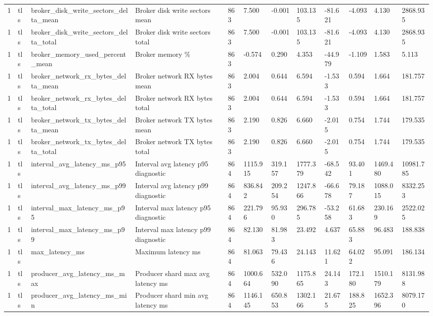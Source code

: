 \begin{longtable}{llllllllllll}
1 & tls & broker\_disk\_write\_sectors\_delta\_mean & Broker disk write sectors mean & 863 & 7.500 & -0.001 & 103.135 & -81.621 & -4.093 & 4.130 & 2868.935 \\
1 & tls & broker\_disk\_write\_sectors\_delta\_total & Broker disk write sectors total & 863 & 7.500 & -0.001 & 103.135 & -81.621 & -4.093 & 4.130 & 2868.935 \\
1 & tls & broker\_memory\_used\_percent\_mean & Broker memory \% & 863 & -0.574 & 0.290 & 4.353 & -44.979 & -1.109 & 1.583 & 5.113 \\
1 & tls & broker\_network\_rx\_bytes\_delta\_mean & Broker network RX bytes mean & 863 & 2.004 & 0.644 & 6.594 & -1.533 & 0.594 & 1.664 & 181.757 \\
1 & tls & broker\_network\_rx\_bytes\_delta\_total & Broker network RX bytes total & 863 & 2.004 & 0.644 & 6.594 & -1.533 & 0.594 & 1.664 & 181.757 \\
1 & tls & broker\_network\_tx\_bytes\_delta\_mean & Broker network TX bytes mean & 863 & 2.190 & 0.826 & 6.660 & -2.015 & 0.754 & 1.744 & 179.535 \\
1 & tls & broker\_network\_tx\_bytes\_delta\_total & Broker network TX bytes total & 863 & 2.190 & 0.826 & 6.660 & -2.015 & 0.754 & 1.744 & 179.535 \\
1 & tls & interval\_avg\_latency\_ms\_p95 & Interval avg latency p95 diagnostic & 864 & 1115.915 & 319.157 & 1777.379 & -68.542 & 93.401 & 1469.480 & 10981.785 \\
1 & tls & interval\_avg\_latency\_ms\_p99 & Interval avg latency p99 diagnostic & 864 & 836.842 & 209.254 & 1247.866 & -66.678 & 79.187 & 1088.015 & 8332.253 \\
1 & tls & interval\_max\_latency\_ms\_p95 & Interval max latency p95 diagnostic & 864 & 221.796 & 95.930 & 296.785 & -53.258 & 61.683 & 230.169 & 2522.025 \\
1 & tls & interval\_max\_latency\_ms\_p99 & Interval max latency p99 diagnostic & 864 & 82.130 & 81.983 & 23.492 & 4.637 & 65.883 & 96.483 & 188.838 \\
1 & tls & max\_latency\_ms & Maximum latency ms & 864 & 81.063 & 79.436 & 24.143 & 11.621 & 64.022 & 95.091 & 186.134 \\
1 & tls & producer\_avg\_latency\_ms\_max & Producer shard max avg latency ms & 864 & 1000.664 & 532.090 & 1175.865 & 24.143 & 172.180 & 1510.179 & 8131.988 \\
1 & tls & producer\_avg\_latency\_ms\_min & Producer shard min avg latency ms & 864 & 1146.145 & 650.853 & 1302.166 & 21.675 & 188.825 & 1652.396 & 8079.170 \\

\end{longtable}
